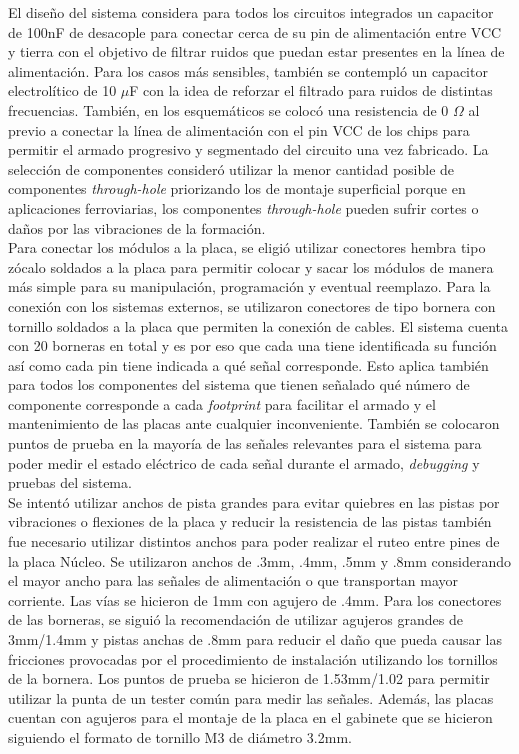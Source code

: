 El diseño del sistema considera para todos los circuitos integrados un capacitor de 100nF de desacople para conectar cerca de su pin de alimentación entre VCC y tierra con el objetivo de filtrar ruidos que puedan estar presentes en la línea de alimentación. Para los casos más sensibles, también se contempló un capacitor electrolítico de 10 $\mu$F con la idea de reforzar el filtrado para ruidos de distintas frecuencias. También, en los esquemáticos se colocó una resistencia de 0 $\Omega$ al previo a conectar la línea de alimentación con el pin VCC de los chips para permitir el armado progresivo y segmentado del circuito una vez fabricado.  La selección de componentes consideró utilizar la menor cantidad posible de componentes \textit{through-hole} priorizando los de montaje superficial porque en aplicaciones ferroviarias, los componentes \textit{through-hole} pueden sufrir cortes o daños por las vibraciones de la formación.\\

Para conectar los módulos a la placa, se eligió utilizar conectores hembra tipo zócalo soldados a la placa para permitir colocar y sacar los módulos de manera más simple para su manipulación, programación y eventual reemplazo. Para la conexión con los sistemas externos, se utilizaron conectores de tipo bornera con tornillo soldados a la placa que permiten la conexión de cables. El sistema cuenta con 20 borneras en total y es por eso que cada una tiene identificada su función así como cada pin tiene indicada a qué señal corresponde. Esto aplica también para todos los componentes del sistema que tienen señalado qué número de componente corresponde a cada \textit{footprint} para facilitar el armado y el mantenimiento de las placas ante cualquier inconveniente. También se colocaron puntos de prueba en la mayoría de las señales relevantes para el sistema para poder medir el estado eléctrico de cada señal durante el armado, \textit{debugging} y pruebas del sistema. \\



Se intentó utilizar anchos de pista grandes para evitar quiebres en las pistas por vibraciones o flexiones de la placa y reducir la resistencia de las pistas también fue necesario utilizar distintos anchos para poder realizar el ruteo entre pines de la placa Núcleo. Se utilizaron anchos de .3mm, .4mm, .5mm y .8mm considerando el mayor ancho para las señales de alimentación o que transportan mayor corriente. Las vías se hicieron de 1mm con agujero de .4mm. Para los conectores de las borneras, se siguió la recomendación de utilizar agujeros grandes de 3mm/1.4mm y pistas anchas de .8mm para reducir el daño que pueda causar las fricciones provocadas por el procedimiento de instalación utilizando los tornillos de la bornera. Los puntos de prueba se hicieron de 1.53mm/1.02 para permitir utilizar la punta de un tester común para medir las señales. Además, las placas cuentan con agujeros para el montaje de la placa en el gabinete que se hicieron siguiendo el formato de tornillo M3 de diámetro 3.2mm. \\

